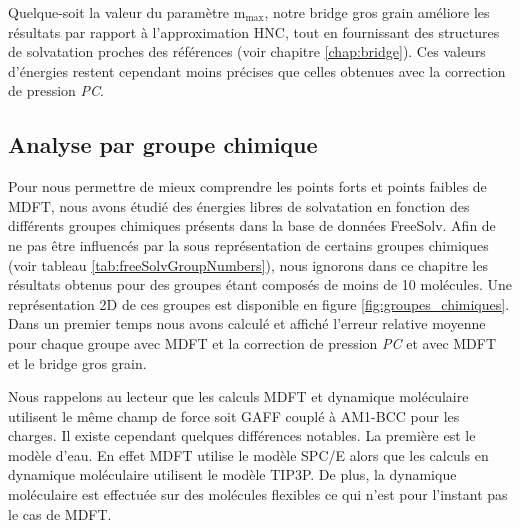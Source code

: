 Quelque-soit la valeur du paramètre $\mathrm{m}_\mathrm{max}$, notre bridge gros grain améliore les résultats par rapport à l'approximation HNC, tout en fournissant des structures de solvatation proches des références (voir chapitre \ref{chap:bridge}). Ces valeurs d'énergies restent cependant moins précises que celles obtenues avec la correction de pression \textit{PC}.

\clearpage





\subsection{Analyse par groupe chimique}
Pour nous permettre de mieux comprendre les points forts et points faibles de MDFT, nous avons étudié des énergies libres de solvatation en fonction des différents groupes chimiques présents dans la base de données FreeSolv. Afin de ne pas être influencés par la sous représentation de certains groupes chimiques (voir tableau \ref{tab:freeSolvGroupNumbers}), nous ignorons dans ce chapitre les résultats obtenus pour des groupes étant composés de moins de 10 molécules. Une représentation 2D de ces groupes est disponible en figure \ref{fig:groupes_chimiques}. Dans un premier temps nous avons calculé et affiché l'erreur relative moyenne pour chaque groupe avec MDFT et la correction de pression \textit{PC} et avec MDFT et le bridge gros grain.

Nous rappelons au lecteur que les calculs MDFT et dynamique moléculaire utilisent le même champ de force soit GAFF couplé à AM1-BCC pour les charges. Il existe cependant quelques différences notables. La première est le modèle d'eau. En effet MDFT utilise le modèle SPC/E alors que les calculs en dynamique moléculaire utilisent le modèle TIP3P. De plus, la dynamique moléculaire est effectuée sur des molécules flexibles ce qui n'est pour l'instant pas le cas de MDFT. 

